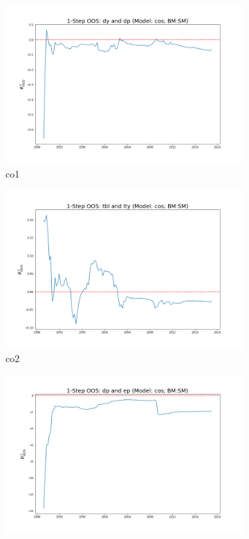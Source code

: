 \documentclass[a4paper,12pt,times,numbered,print,index]{report}
\numberwithin{equation}{section}
\begin{document}
\begin{figure}[!htbp]
	\centering
	\caption{OOS Results for Model with $f_2$}
	\begin{subfigure}[b]{0.42\linewidth}
		\includegraphics[width=0.9\linewidth]{OOS_plots/cos_co1_SM.png}
		\caption{co1}
	\end{subfigure}
	\begin{subfigure}[b]{0.42\linewidth}
		\includegraphics[width=0.9\linewidth]{OOS_plots/cos_co2_SM.png}
		\caption{co2}
	\end{subfigure}
	\begin{subfigure}[b]{0.42\linewidth}
		\includegraphics[width=0.9\linewidth]{OOS_plots/cos_co3_SM.png}

\end{subfigure}
\end{figure}
\end{document}

